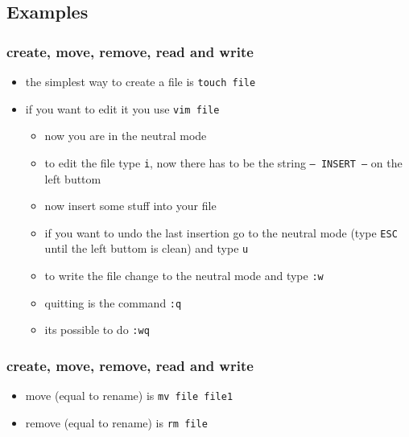 \documentclass[handout]{beamer}
\newcommand{\code}[1]{\colorbox{lGray}{\texttt{#1}}}
\begin{document}
    \subsection{Examples}
        \begin{frame}
			\frametitle{create, move, remove, read and write}
			\begin{itemize}
                \item<1-> the simplest way to create a file is \code{touch file}
                \item<2-> if you want to edit it you use \code{vim file}
                \begin{itemize}
                    \item<2-> now you are in the neutral mode
                    \item<3-> to edit the file type \code{i}, now there has to be the string \code{-- INSERT --} on the left buttom
                    \item<3-> now insert some stuff into your file
                    \item<4-> if you want to undo the last insertion go to the neutral mode (type \code{ESC} until the left buttom is clean) and type \code{u}
                    \item<5-> to write the file change to the neutral mode and type \code{:w}
                    \item<6-> quitting is the command \code{:q}
                    \item<6-> its possible to do \code{:wq}
                \end{itemize}
            \end{itemize}
		\end{frame}
        \begin{frame}
			\frametitle{create, move, remove, read and write}
			\begin{itemize}
                \item<1-> move (equal to rename) is \code{mv file file1}
                \item<1-> remove (equal to rename) is \code{rm file}
            \end{itemize}
		\end{frame}
        
\end{document}
